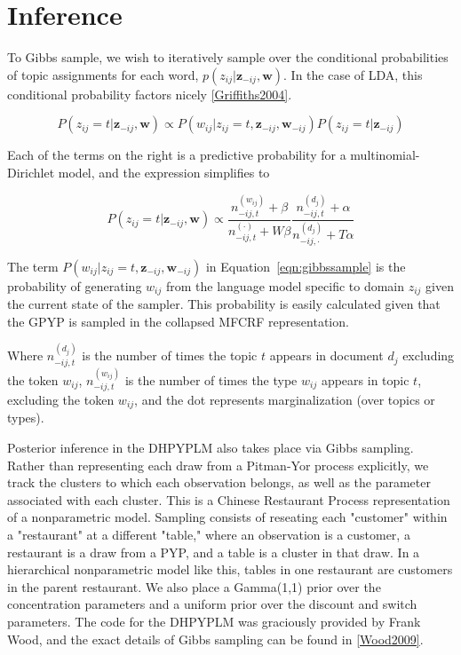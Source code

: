 \section{Inference}

To Gibbs sample, we wish to iteratively sample over the conditional probabilities of topic assignments for each word, $p(z_{ij}|\mathbf{z}_{-ij},\mathbf{w})$.  In the case of LDA, this conditional probability factors nicely \ref{Griffiths2004}.

\begin{equation}
P(z_{ij}=t | \mathbf{z}_{-ij},\mathbf{w}) \propto P(w_{ij}|z_{ij}=t, \mathbf{z}_{-ij}, \mathbf{w}_{-ij})P(z_{ij} = t | \mathbf{z}_{-ij}) \label{eqn:gibbssample}
\end{equation}

Each of the terms on the right is a predictive probability for a multinomial-Dirichlet model, and the expression simplifies to

\begin{equation}
P(z_{ij}=t | \mathbf{z}_{-ij},\mathbf{w}) \propto \frac{n^{(w_{ij})}_{-ij,t} + \beta}{n^{(\cdot)}_{-ij,t} + W\beta} \frac{n^{(d_j)}_{-ij,t} + \alpha}{n^{(d_j)}_{-ij,\cdot} + T\alpha} 
\end{equation}

The term $P(w_{ij}|z_{ij}=t, \mathbf{z}_{-ij}, \mathbf{w}_{-ij})$ in Equation~\ref{eqn:gibbssample} is the probability of generating $w_{ij}$ from the language model specific to domain $z_{ij}$ given the current state of the sampler.  This probability is easily calculated given that the GPYP is sampled in the collapsed MFCRF representation.

Where $n^{(d_j)}_{-ij,t}$ is the number of times the topic $t$ appears in document $d_j$ excluding the token $w_{ij}$, $n^{(w_{ij})}_{-ij,t}$ is the number of times the type $w_{ij}$ appears in topic $t$, excluding the token $w_{ij}$, and the dot represents marginalization (over topics or types).

Posterior inference in the DHPYPLM also takes place via Gibbs sampling.  Rather than representing each draw from a Pitman-Yor process explicitly, we track the clusters to which each observation belongs, as well as the parameter associated with each cluster.  This is a Chinese Restaurant Process representation of a nonparametric model.  Sampling consists of reseating each "customer" within a "restaurant" at a different "table," where an observation is a customer, a restaurant is a draw from a PYP, and a table is a cluster in that draw. In a hierarchical nonparametric model like this, tables in one restaurant are customers in the parent restaurant.  We also place a Gamma(1,1) prior over the concentration parameters and a uniform prior over the discount and switch parameters.  The code for the DHPYPLM was graciously provided by Frank Wood, and the exact details of Gibbs sampling can be found in \ref{Wood2009}.

